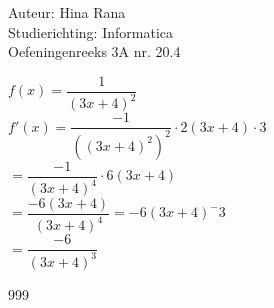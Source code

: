 \documentclass[a4paper]{article}
\begin{document}
\noindent \large Auteur: Hina Rana \\
\noindent \large Studierichting: Informatica\\
\noindent \large Oefeningenreeks 3A nr. 20.4\\

\medskip

\normalsize
$f(x) = \dfrac{1}{(3x+4)^2}$\\

$f'(x) = \dfrac{-1}{((3x+4)^2)^2} \cdot 2(3x+4) \cdot 3$\\

$= \dfrac{-1}{(3x+4)^4} \cdot 6(3x+4)$\\

$= \dfrac{-6(3x+4)}{(3x+4)^4} =-6(3x+4)^-3$\\

$=\dfrac{-6}{(3x+4)^3}$

\begin{thebibliography}{999}
\end{thebibliography}
\end{document}

